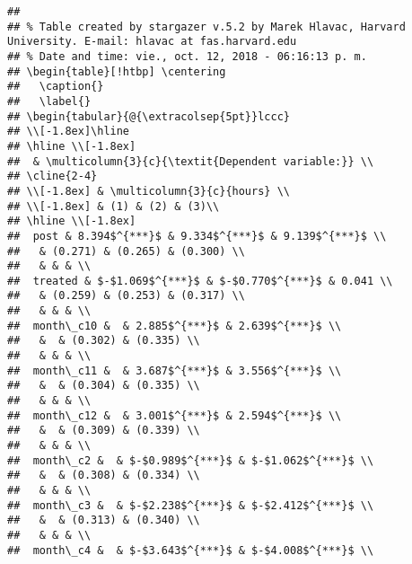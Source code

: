 \documentclass[11pt,]{article}
\begin{document}
\begin{verbatim}
## 
## % Table created by stargazer v.5.2 by Marek Hlavac, Harvard University. E-mail: hlavac at fas.harvard.edu
## % Date and time: vie., oct. 12, 2018 - 06:16:13 p. m.
## \begin{table}[!htbp] \centering 
##   \caption{} 
##   \label{} 
## \begin{tabular}{@{\extracolsep{5pt}}lccc} 
## \\[-1.8ex]\hline 
## \hline \\[-1.8ex] 
##  & \multicolumn{3}{c}{\textit{Dependent variable:}} \\ 
## \cline{2-4} 
## \\[-1.8ex] & \multicolumn{3}{c}{hours} \\ 
## \\[-1.8ex] & (1) & (2) & (3)\\ 
## \hline \\[-1.8ex] 
##  post & 8.394$^{***}$ & 9.334$^{***}$ & 9.139$^{***}$ \\ 
##   & (0.271) & (0.265) & (0.300) \\ 
##   & & & \\ 
##  treated & $-$1.069$^{***}$ & $-$0.770$^{***}$ & 0.041 \\ 
##   & (0.259) & (0.253) & (0.317) \\ 
##   & & & \\ 
##  month\_c10 &  & 2.885$^{***}$ & 2.639$^{***}$ \\ 
##   &  & (0.302) & (0.335) \\ 
##   & & & \\ 
##  month\_c11 &  & 3.687$^{***}$ & 3.556$^{***}$ \\ 
##   &  & (0.304) & (0.335) \\ 
##   & & & \\ 
##  month\_c12 &  & 3.001$^{***}$ & 2.594$^{***}$ \\ 
##   &  & (0.309) & (0.339) \\ 
##   & & & \\ 
##  month\_c2 &  & $-$0.989$^{***}$ & $-$1.062$^{***}$ \\ 
##   &  & (0.308) & (0.334) \\ 
##   & & & \\ 
##  month\_c3 &  & $-$2.238$^{***}$ & $-$2.412$^{***}$ \\ 
##   &  & (0.313) & (0.340) \\ 
##   & & & \\ 
##  month\_c4 &  & $-$3.643$^{***}$ & $-$4.008$^{***}$ \\ 

\end{verbatim}
\end{document}

